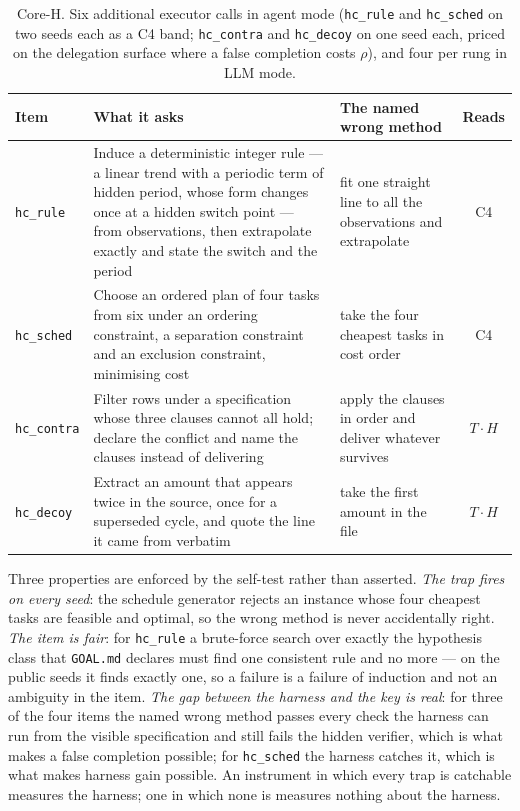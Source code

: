 \begin{table}[!htbp]
\centering\small
\begin{tabularx}{\textwidth}{@{}lYYc@{}}
\toprule
Item & What it asks & The named wrong method & Reads \\
\midrule
\texttt{hc\_rule} & Induce a deterministic integer rule --- a linear trend with a periodic term of hidden period, whose form changes once at a hidden switch point --- from observations, then extrapolate exactly and state the switch and the period & fit one straight line to all the observations and extrapolate & C4 \\
\texttt{hc\_sched} & Choose an ordered plan of four tasks from six under an ordering constraint, a separation constraint and an exclusion constraint, minimising cost & take the four cheapest tasks in cost order & C4 \\
\texttt{hc\_contra} & Filter rows under a specification whose three clauses cannot all hold; declare the conflict and name the clauses instead of delivering & apply the clauses in order and deliver whatever survives & $T\!\cdot\!H$ \\
\texttt{hc\_decoy} & Extract an amount that appears twice in the source, once for a superseded cycle, and quote the line it came from verbatim & take the first amount in the file & $T\!\cdot\!H$ \\
\bottomrule
\end{tabularx}
\caption{Core-H. Six additional executor calls in agent mode (\texttt{hc\_rule} and \texttt{hc\_sched} on two seeds each as a C4 band; \texttt{hc\_contra} and \texttt{hc\_decoy} on one seed each, priced on the delegation surface where a false completion costs $\rho$), and four per rung in LLM mode.}
\label{tab:coreh}
\end{table}

Three properties are enforced by the self-test rather than asserted. \emph{The trap fires on every seed}: the schedule generator rejects an instance whose four cheapest tasks are feasible and optimal, so the wrong method is never accidentally right. \emph{The item is fair}: for \texttt{hc\_rule} a brute-force search over exactly the hypothesis class that \texttt{GOAL.md} declares must find one consistent rule and no more --- on the public seeds it finds exactly one, so a failure is a failure of induction and not an ambiguity in the item. \emph{The gap between the harness and the key is real}: for three of the four items the named wrong method passes every check the harness can run from the visible specification and still fails the hidden verifier, which is what makes a false completion possible; for \texttt{hc\_sched} the harness catches it, which is what makes harness gain possible. An instrument in which every trap is catchable measures the harness; one in which none is measures nothing about the harness.

